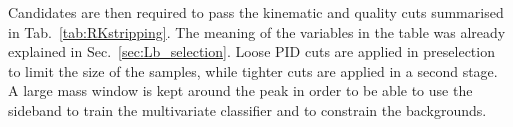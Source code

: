 Candidates are then required to pass the kinematic and quality cuts summarised in Tab.~\ref{tab:RKstripping}. 
The meaning of the variables in the table was already explained in Sec.~\ref{sec:Lb_selection}.
Loose PID cuts are applied in preselection to limit the size of the samples, while tighter cuts are applied
in a second stage. A large mass window is kept around the \Bz peak in order to be able
to use the sideband to train the multivariate classifier and to constrain the backgrounds.
%
%
